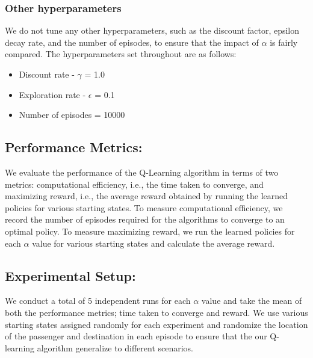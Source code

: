 \documentclass[conference]{IEEEtran}
\begin{document}
\subsubsection{Other hyperparameters}
We do not tune any other hyperparameters, such as the discount factor, epsilon decay rate, and the number of episodes, to ensure that the impact of $\alpha$ is fairly compared. The hyperparameters set throughout are as follows: 
\begin{itemize}
    \item Discount rate - $\gamma$ = 1.0
    \item Exploration rate - $\epsilon$ = 0.1
    \item Number of episodes = 10000
    \newline
\end{itemize} 

\subsection{Performance Metrics:}
We evaluate the performance of the Q-Learning algorithm in terms of two metrics: computational efficiency, i.e., the time taken to converge, and maximizing reward, i.e., the average reward obtained by running the learned policies for various starting states. To measure computational efficiency, we record the number of episodes required for the algorithms to converge to an optimal policy. To measure maximizing reward, we run the learned policies for each $\alpha$ value for various starting states and calculate the average reward. 

\subsection{Experimental Setup:}
We conduct a total of 5 independent runs for each $\alpha$ value and take the mean of both the performance metrics; time taken to converge and reward. We use various starting states assigned randomly for each experiment and randomize the location of the passenger and destination in each episode to ensure that the our Q-learning algorithm generalize to different scenarios. 
\end{document}
